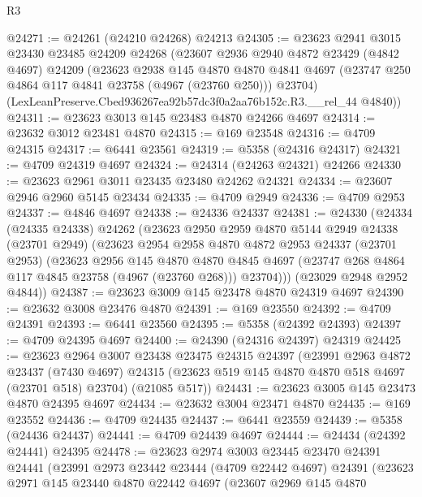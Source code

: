 \begin{lexlean}{R3}
\begin{coremodule}
@24271 := @24261 (@24210 @24268) @24213
@24305 := @23623
    @2941
    @3015
    @23430
    @23485
    @24209
    @24268
    (@23607
      @2936
      @2940
      @4872
      @23429
      (@4842 @4697)
      @24209
      (@23623
        @2938
        @145
        @4870
        @4870
        @4841
        @4697
        (@23747 @250 @4864 @117 @4841 @23758 (@4967 (@23760 @250)))
        @23704)
      (LexLeanPreserve.Cbed936267ea92b57dc3f0a2aa76b152c.R3.__rel_44 @4840))
@24311 := @23623 @3013 @145 @23483 @4870 @24266 @4697
@24314 := @23632 @3012 @23481 @4870
@24315 := @169 @23548
@24316 := @4709 @24315
@24317 := @6441 @23561
@24319 := @5358 (@24316 @24317)
@24321 := @4709 @24319 @4697
@24324 := @24314 (@24263 @24321) @24266
@24330 := @23623 @2961 @3011 @23435 @23480 @24262 @24321
@24334 := @23607 @2946 @2960 @5145 @23434
@24335 := @4709 @2949
@24336 := @4709 @2953
@24337 := @4846 @4697
@24338 := @24336 @24337
@24381 := @24330
    (@24334
      (@24335 @24338)
      @24262
      (@23623
        @2950
        @2959
        @4870
        @5144
        @2949
        @24338
        (@23701 @2949)
        (@23623
          @2954
          @2958
          @4870
          @4872
          @2953
          @24337
          (@23701 @2953)
          (@23623
            @2956
            @145
            @4870
            @4870
            @4845
            @4697
            (@23747 @268 @4864 @117 @4845 @23758 (@4967 (@23760 @268)))
            @23704)))
      (@23029 @2948 @2952 @4844))
@24387 := @23623 @3009 @145 @23478 @4870 @24319 @4697
@24390 := @23632 @3008 @23476 @4870
@24391 := @169 @23550
@24392 := @4709 @24391
@24393 := @6441 @23560
@24395 := @5358 (@24392 @24393)
@24397 := @4709 @24395 @4697
@24400 := @24390 (@24316 @24397) @24319
@24425 := @23623
    @2964
    @3007
    @23438
    @23475
    @24315
    @24397
    (@23991
      @2963
      @4872
      @23437
      (@7430 @4697)
      @24315
      (@23623 @519 @145 @4870 @4870 @518 @4697 (@23701 @518) @23704)
      (@21085 @517))
@24431 := @23623 @3005 @145 @23473 @4870 @24395 @4697
@24434 := @23632 @3004 @23471 @4870
@24435 := @169 @23552
@24436 := @4709 @24435
@24437 := @6441 @23559
@24439 := @5358 (@24436 @24437)
@24441 := @4709 @24439 @4697
@24444 := @24434 (@24392 @24441) @24395
@24478 := @23623
    @2974
    @3003
    @23445
    @23470
    @24391
    @24441
    (@23991
      @2973
      @23442
      @23444
      (@4709 @22442 @4697)
      @24391
      (@23623
        @2971
        @145
        @23440
        @4870
        @22442
        @4697
        (@23607
          @2969
          @145
          @4870

\end{coremodule}
\end{lexlean}
